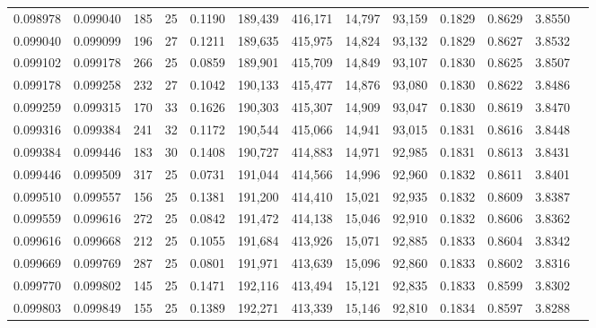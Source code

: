 \begin{tabular}{rrrrrrrrrrrrr}
0.098978 & 0.099040 & 185 &  25 &                                     0.1190 & 189,439 & 416,171 &  14,797 &  93,159 & 0.1829 & 0.8629 & 3.8550 \\
0.099040 & 0.099099 & 196 &  27 &                                     0.1211 & 189,635 & 415,975 &  14,824 &  93,132 & 0.1829 & 0.8627 & 3.8532 \\
0.099102 & 0.099178 & 266 &  25 &                                     0.0859 & 189,901 & 415,709 &  14,849 &  93,107 & 0.1830 & 0.8625 & 3.8507 \\
0.099178 & 0.099258 & 232 &  27 &                                     0.1042 & 190,133 & 415,477 &  14,876 &  93,080 & 0.1830 & 0.8622 & 3.8486 \\
0.099259 & 0.099315 & 170 &  33 &                                     0.1626 & 190,303 & 415,307 &  14,909 &  93,047 & 0.1830 & 0.8619 & 3.8470 \\
0.099316 & 0.099384 & 241 &  32 &                                     0.1172 & 190,544 & 415,066 &  14,941 &  93,015 & 0.1831 & 0.8616 & 3.8448 \\
0.099384 & 0.099446 & 183 &  30 &                                     0.1408 & 190,727 & 414,883 &  14,971 &  92,985 & 0.1831 & 0.8613 & 3.8431 \\
0.099446 & 0.099509 & 317 &  25 &                                     0.0731 & 191,044 & 414,566 &  14,996 &  92,960 & 0.1832 & 0.8611 & 3.8401 \\
0.099510 & 0.099557 & 156 &  25 &                                     0.1381 & 191,200 & 414,410 &  15,021 &  92,935 & 0.1832 & 0.8609 & 3.8387 \\
0.099559 & 0.099616 & 272 &  25 &                                     0.0842 & 191,472 & 414,138 &  15,046 &  92,910 & 0.1832 & 0.8606 & 3.8362 \\
0.099616 & 0.099668 & 212 &  25 &                                     0.1055 & 191,684 & 413,926 &  15,071 &  92,885 & 0.1833 & 0.8604 & 3.8342 \\
0.099669 & 0.099769 & 287 &  25 &                                     0.0801 & 191,971 & 413,639 &  15,096 &  92,860 & 0.1833 & 0.8602 & 3.8316 \\
0.099770 & 0.099802 & 145 &  25 &                                     0.1471 & 192,116 & 413,494 &  15,121 &  92,835 & 0.1833 & 0.8599 & 3.8302 \\
0.099803 & 0.099849 & 155 &  25 &                                     0.1389 & 192,271 & 413,339 &  15,146 &  92,810 & 0.1834 & 0.8597 & 3.8288 \\

\end{tabular}
